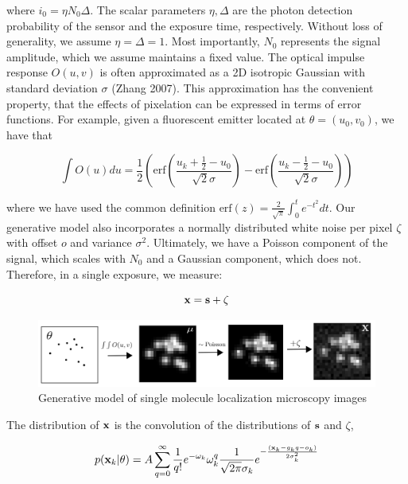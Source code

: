 \documentclass{article}
\begin{document}
where $i_{0} = \eta N_{0}\Delta$. The scalar parameters $\eta,\Delta$ are the photon detection probability of the sensor and the exposure time, respectively. Without loss of generality, we assume $\eta = \Delta = 1$. Most importantly, $N_{0}$ represents the signal amplitude, which we assume maintains a fixed value. The optical impulse response $O(u,v)$ is often approximated as a 2D isotropic Gaussian with standard deviation $\sigma$ (Zhang 2007). This approximation has the convenient property, that the effects of pixelation can be expressed in terms of error functions. For example, given a fluorescent emitter located at $\theta = (u_{0},v_{0})$, we have that

\begin{equation}
\int O(u)du = \frac{1}{2}\left(\mathrm{erf}\left(\frac{u_{k}+\frac{1}{2}-u_{0}}{\sqrt{2}\sigma}\right) -\mathrm{erf}\left(\frac{u_{k}-\frac{1}{2}-u_{0}}{\sqrt{2}\sigma}\right)\right)
\end{equation}

where we have used the common definition $\mathrm{erf}(z) = \frac{2}{\sqrt{\pi}}\int_{0}^{t}e^{-t^{2}}dt$. Our generative model also incorporates a normally distributed white noise per pixel $\zeta$ with offset $o$ and variance $\sigma^{2}$. Ultimately, we have a Poisson component of the signal, which scales with $N_{0}$ and a Gaussian component, which does not. Therefore, in a single exposure, we measure: 

\begin{equation}
\bold{x} = \bold{s} + \bold{\zeta}
\end{equation}


\begin{figure}
\includegraphics[scale=0.65]{Generation-Figure.png}
\caption{Generative model of single molecule localization microscopy images}
\end{figure}

The distribution of $\bold{x}$ is the convolution of the distributions of $\bold{s}$ and $\zeta$,

\begin{equation}
p(\bold{x}_{k}|\theta) = A\sum_{q=0}^{\infty} \frac{1}{q!}e^{-\omega_{k}}\omega_{k}^{q}\frac{1}{\sqrt{2\pi}\sigma_{k}}e^{-\frac{(\bold{x}_{k}-g_{k}q-o_{k})}{2\sigma_{k}^{2}}}
\end{equation}
\end{document}
